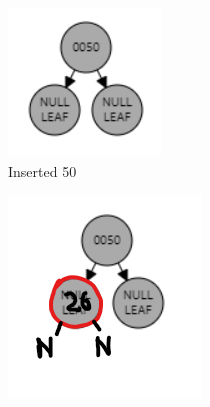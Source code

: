 \documentclass[12pt, a4paper]{article}
\begin{document}
\begin{enumerate}
    \begin{figure}[h!]
      \begin{subfigure}[b]{0.3\textwidth}
        \centering
        \includegraphics[width=\textwidth]{3-1-a}
        \caption{Inserted 50}
        \label{fig:3-1-a}
      \end{subfigure}
      \hfill
      \begin{subfigure}[b]{0.3\textwidth}
        \centering
        \includegraphics[width=\textwidth]{3-1-b}

\end{subfigure}
\end{figure}
\end{enumerate}
\end{document}
